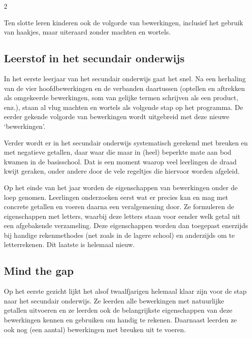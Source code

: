 \begin{multicols}{2}

Ten slotte leren kinderen ook de volgorde van bewerkingen, inclusief het gebruik van haakjes, maar uiteraard zonder machten en wortels.

\subsection{Leerstof in het secundair onderwijs}
In het eerste leerjaar van het secundair onderwijs gaat het snel.
Na een herhaling van de vier hoofdbewerkingen en de verbanden daartussen (optellen en aftrekken als omgekeerde bewerkingen, som van gelijke termen schrijven als een product, enz.), staan al vlug machten en wortels als volgende stap op het programma.
De eerder gekende volgorde van bewerkingen wordt uitgebreid met deze nieuwe `bewerkingen'.

Verder wordt er in het secundair onderwijs systematisch gerekend met breuken en met negatieve getallen, daar waar die maar in (heel) beperkte mate aan bod kwamen in de basisschool.
Dat is een moment waarop veel leerlingen de draad kwijt geraken, onder andere door de vele regeltjes die hiervoor worden afgeleid.

Op het einde van het jaar worden de eigenschappen van bewerkingen onder de loep genomen.
Leerlingen onderzoeken eerst wat er precies kan en mag met concrete getallen en voeren daarna een veralgemening door.
Ze formuleren de eigenschappen met letters, waarbij deze letters staan voor eender welk getal uit een afgebakende verzameling.
Deze eigenschappen worden dan toegepast enerzijds bij handige rekenmethodes (net zoals in de lagere school) en anderzijds om te letterrekenen.
Dit laatste is helemaal nieuw.

\subsection{Mind the gap}

Op het eerste gezicht lijkt het alsof twaalfjarigen helemaal klaar zijn voor de stap naar het secundair onderwijs.
Ze leerden alle bewerkingen met natuurlijke getallen uitvoeren en ze leerden ook de belangrijkste eigenschappen van deze bewerkingen kennen en gebruiken om handig te rekenen.
Daarnaast leerden ze ook nog (een aantal) bewerkingen met breuken uit te voeren.


\end{multicols}
